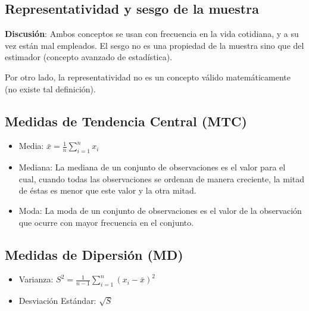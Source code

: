 \documentclass[
]{book}
\providecommand{\tightlist}{%
  \setlength{\itemsep}{0pt}\setlength{\parskip}{0pt}}
\theoremstyle{definition}
\theoremstyle{definition}
\theoremstyle{definition}
\theoremstyle{definition}
\theoremstyle{remark}
\begin{document}
\hypertarget{representatividad-y-sesgo-de-la-muestra}{%
\subsection*{Representatividad y sesgo de la muestra}\label{representatividad-y-sesgo-de-la-muestra}}

\textbf{Discusión}: Ambos conceptos se usan con frecuencia en la vida cotidiana, y a su vez están mal empleados. El sesgo no es una propiedad de la muestra sino que del estimador (concepto avanzado de estadística).

Por otro lado, la representatividad no es un concepto válido matemáticamente (no existe tal definición).

\hypertarget{medidas-de-tendencia-central-mtc}{%
\subsection*{Medidas de Tendencia Central (MTC)}\label{medidas-de-tendencia-central-mtc}}

\begin{itemize}
\tightlist
\item
  Media: \(\bar{x} = \displaystyle\frac{1}{n}\displaystyle\sum_{i=1}^n x_i\)
\item
  Mediana: La mediana de un conjunto de observaciones es el valor para el cual, cuando todas las observaciones se ordenan de manera creciente, la mitad de éstas es menor que este valor y la otra mitad.
\item
  Moda: La moda de un conjunto de observaciones es el valor de la observación que ocurre con mayor frecuencia en el conjunto.
\end{itemize}

\hypertarget{medidas-de-dipersiuxf3n-md}{%
\subsection*{Medidas de Dipersión (MD)}\label{medidas-de-dipersiuxf3n-md}}

\begin{itemize}
\tightlist
\item
  Varianza: \(S^2 = \displaystyle{\frac{1}{n-1}\sum_{i=1}^n (x_i-\bar{x})^2}\)
\item
  Desviación Estándar: \(\sqrt{S}\)
\end{itemize}
\end{document}
